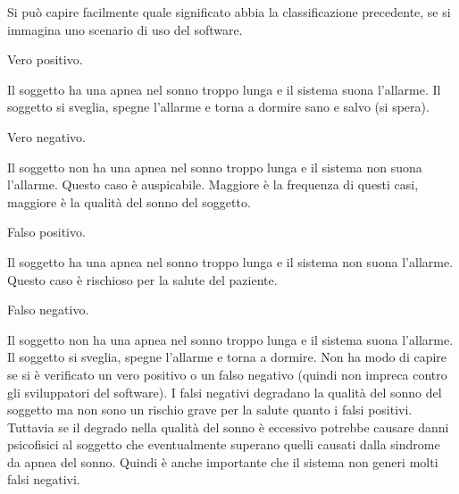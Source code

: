 Si pu\`o capire facilmente quale significato abbia la classificazione precedente, se si immagina uno scenario di uso del software.


\begin{bf}Vero positivo.\end{bf}
  Il soggetto ha una apnea nel sonno troppo lunga e il sistema suona l'allarme. Il soggetto si sveglia, spegne l'allarme e torna a dormire sano e salvo (si spera).


\begin{bf}Vero negativo.\end{bf}
  Il soggetto non ha una apnea nel sonno troppo lunga e il sistema non suona l'allarme. Questo caso \`e auspicabile. Maggiore \`e la frequenza di questi casi, maggiore \`e la qualit\`a del sonno del soggetto.


\begin{bf}Falso positivo.\end{bf}
  Il soggetto ha una apnea nel sonno troppo lunga e il sistema non suona l'allarme. Questo caso \`e rischioso per la salute del paziente.


\begin{bf}Falso negativo.\end{bf}
  Il soggetto non ha una apnea nel sonno troppo lunga e il sistema suona l'allarme. Il soggetto si sveglia, spegne l'allarme e torna a dormire. Non ha modo di capire se si \`e verificato un vero positivo o un falso negativo (quindi non impreca contro gli sviluppatori del software).
    I falsi negativi degradano la qualit\`a del sonno del soggetto ma non sono un rischio grave per la salute quanto i falsi positivi.
    Tuttavia se il degrado nella qualit\`a del sonno \`e eccessivo potrebbe causare danni psicofisici al soggetto che eventualmente superano quelli causati dalla sindrome da apnea del sonno.
    Quindi \`e anche importante che il sistema non generi molti falsi negativi.


